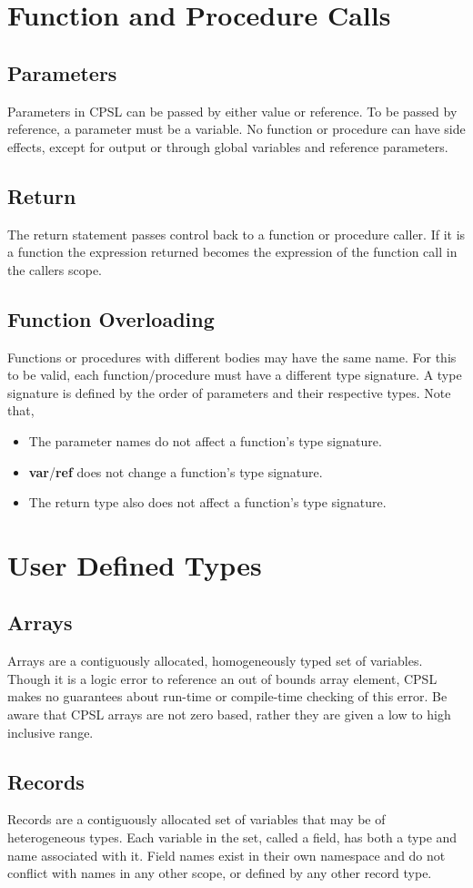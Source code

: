\documentclass{book}
\begin{document}
\section{Function and Procedure Calls}
\subsection{Parameters}
Parameters in CPSL can be passed by either value or reference. To be passed by
reference, a parameter must be a variable. No function or procedure can have
side effects, except for output or through global variables and reference
parameters.
\subsection{Return}
The return statement passes control back to a function or procedure caller.  If it is a function the expression returned becomes the expression of the function call in the callers scope.
\subsection{Function Overloading}
Functions or procedures with different bodies may have the same name. For this
to be valid, each function/procedure must have a different type signature. A type
signature is defined by the order of parameters and their respective types. Note
that,

\begin{itemize}
\item The parameter names do not affect a function's type signature.
\item \textbf{var}/\textbf{ref} does not change a function's type signature.
\item The return type also does not affect a function's type signature.
\end{itemize}

\section{User Defined Types}
\subsection{Arrays}
Arrays are a contiguously allocated, homogeneously typed set of variables.
Though it is a logic error to reference an out of bounds array element, CPSL makes no guarantees about run-time or compile-time checking of this error.
Be aware that CPSL arrays are not zero based, rather they are given a low to high inclusive range.
\subsection{Records}
Records are a contiguously allocated set of variables that may be of heterogeneous types.  Each variable in the set, called a field, has both a type and name associated with it.  Field names exist in their own namespace and do not conflict with names in any other scope, or defined by any other record type.
\end{document}
